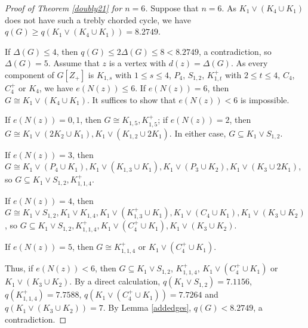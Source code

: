 \documentclass[12pt]{article}
\begin{document}
\begin{proof}[Proof of Theorem \ref{doubly21} for $n=6$]
Suppose that $n=6$.
As $K_1\vee(K_4\cup K_1)$ does not have such a trebly chorded cycle, we have $q(G)\ge q(K_1\vee(K_4\cup K_1))=8.2749$.


If $\Delta(G)\le 4$, then $q(G)\le 2\Delta(G)\le 8<8.2749$, a contradiction, so  $\Delta(G)=5$. Assume that $z$ is a vertex with $d(z)=\Delta(G)$.
As every component of $G[Z_+]$ is $K_{1,s}$ with $1\le s\le 4$, $P_4$, $S_{1,2}$, $K_{1,t}^+$ with $2\le t\le 4$, $C_4$, $C_4^+$ or $K_4$, we have  $e(N(z))\le 6$.
If $e(N(z))=6$, then $G\cong K_1\vee(K_4\cup K_1)$. It suffices to show that $e(N(z))<6$ is impossible.



If $e(N(z))=0,1$, then $G\cong K_{1,5}, K_{1,5}^+$; if $e(N(z))=2$, then $G\cong K_1\vee (2K_2\cup K_1), K_1\vee (K_{1,2}\cup 2K_1)$.  In either case, $G\subseteq K_1\vee S_{1,2}$.

If $e(N(z))=3$, then $G\cong K_1\vee(P_4\cup K_1), K_1\vee (K_{1,3}\cup K_1), K_1\vee (P_3\cup K_2), K_1\vee(K_3\cup 2K_1)$, so $G\subseteq K_1\vee S_{1,2}, K_{1,1,4}^+$.

If $e(N(z))=4$, then $G\cong  K_1\vee S_{1,2}, K_1\vee K_{1,4},  K_1\vee(K_{1,3}^+\cup K_1), K_1\vee(C_4\cup K_1), K_1\vee(K_3\cup K_2)$, so $G\subseteq K_1\vee S_{1,2}, K_{1,1,4}^+, K_1\vee(C_4^+\cup K_1),K_1\vee(K_3\cup K_2)$.

If $e(N(z))=5$, then $G\cong K_{1,1,4}^+$ or $K_1\vee (C_4^+\cup K_1)$.


Thus, if $e(N(z))<6$, then $G\subseteq K_1\vee S_{1,2}$, $K_{1,1,4}^+$, $K_1\vee(C_4^+\cup K_1)$ or  $K_1\vee(K_3\cup K_2)$.
By a direct calculation, $q(K_1\vee S_{1,2})=7.1156$, $q(K_{1,1,4}^+)=7.7588$,
$q(K_1\vee(C_4^+\cup K_1))=7.7264$ and $q(K_1\vee(K_3\cup K_2))=7$. By Lemma \ref{addedges}, $q(G)<8.2749$, a contradiction.
\end{proof}
\end{document}
